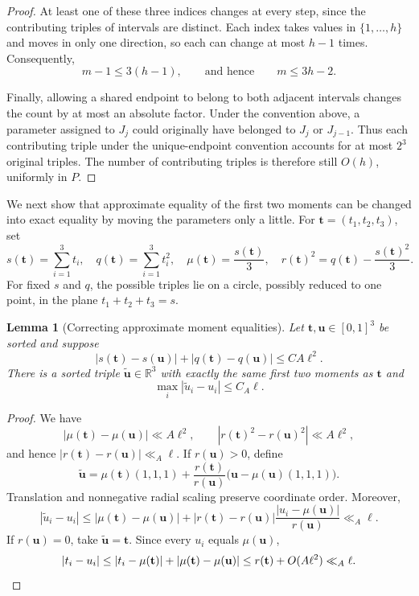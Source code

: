 \documentclass{amsart}
\numberwithin{equation}{section}
\newtheorem{lemma}[theorem]{Lemma}
\newcommand{\R}{\mathbb{R}}
\begin{document}
\begin{proof}
At least one of these three indices changes at every step, since the
contributing triples of intervals are distinct. Each index takes
values in $\{1,\ldots,h\}$ and moves in only one direction, so each can
change at most $h-1$ times. Consequently,
\[
    m-1\le 3(h-1),
    \qquad\text{and hence}\qquad
    m\le 3h-2.
\]

Finally, allowing a shared endpoint to belong to both adjacent
intervals changes the count by at most an absolute factor. Under the
convention above, a parameter assigned to $J_j$ could originally have
belonged to $J_j$ or $J_{j-1}$. Thus each contributing triple under the
unique-endpoint convention accounts for at most $2^3$ original triples.
The number of contributing triples is therefore still $O(h)$, uniformly
in $P$.









\end{proof}

We next show that approximate equality of the first two moments can be changed
into exact equality by moving the parameters only a little.  For
$\mathbf{t}=(t_1,t_2,t_3)$, set
\[
 s(\mathbf{t})=\sum_{i=1}^3t_i,
 \quad q(\mathbf{t})=\sum_{i=1}^3t_i^2,
 \quad \mu(\mathbf{t})=\frac{s(\mathbf{t})}3,
 \quad r(\mathbf{t})^2=q(\mathbf{t})-\frac{s(\mathbf{t})^2}{3}.
\]
For fixed $s$ and $q$, the possible triples lie on a circle, possibly reduced
to one point, in the plane $t_1+t_2+t_3=s$.

\begin{lemma}[Correcting approximate moment equalities]\label{lem:exactification}
Let $\mathbf{t},\mathbf{u}\in[0,1]^3$ be sorted and suppose
\[
 |s(\mathbf{t})-s(\mathbf{u})|+|q(\mathbf{t})-q(\mathbf{u})|\le C A\ell^2.
\]
There is a sorted triple $\widetilde{\mathbf{u}}\in\R^3$ with exactly the same
first two moments as $\mathbf{t}$ and
\[
 \max_i|\widetilde u_i-u_i|\le C_A\ell.
\]
\end{lemma}

\begin{proof}
We have
\[
 |\mu(\mathbf{t})-\mu(\mathbf{u})|\ll A\ell^2,
 \qquad
 |r(\mathbf{t})^2-r(\mathbf{u})^2|\ll A\ell^2,
\]
and hence $|r(\mathbf{t})-r(\mathbf{u})|\ll_A\ell$.  If
$r(\mathbf{u})>0$, define
\[
 \widetilde{\mathbf{u}}
 =\mu(\mathbf{t})(1,1,1)
  +\frac{r(\mathbf{t})}{r(\mathbf{u})}
       \big(\mathbf{u}-\mu(\mathbf{u})(1,1,1)\big).
\]
Translation and nonnegative radial scaling preserve coordinate order.  Moreover,
\[
 |\widetilde u_i-u_i|
 \le |\mu(\mathbf{t})-\mu(\mathbf{u})|
 +|r(\mathbf{t})-r(\mathbf{u})|
   \frac{|u_i-\mu(\mathbf{u})|}{r(\mathbf{u})}
 \ll_A\ell.
\]
If $r(\mathbf{u})=0$, take $\widetilde{\mathbf{u}}=\mathbf{t}$.  Since every $u_i$ equals
$\mu(\mathbf{u})$,
\[
    |t_i-u_i|\le |t_i-\mu(\mathbf{t})|+|\mu(\mathbf{t})-\mu(\mathbf{u})| \le r(\mathbf{t})+O(A\ell^2)\ll_A\ell. \qedhere
\]
\end{proof}
\end{document}
